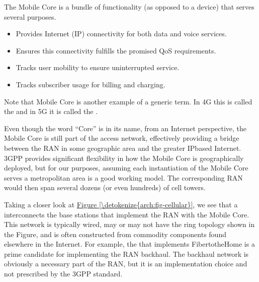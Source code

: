 \documentclass[a4paper,11pt,english]{sphinxmanual}
\begin{document}
\sphinxAtStartPar
The Mobile Core is a bundle of functionality (as opposed to a
device) that serves several purposes.
\begin{itemize}
\item {} 
\sphinxAtStartPar
Provides Internet (IP) connectivity for both data and voice services.

\item {} 
\sphinxAtStartPar
Ensures this connectivity fulfills the promised QoS requirements.

\item {} 
\sphinxAtStartPar
Tracks user mobility to ensure uninterrupted service.

\item {} 
\sphinxAtStartPar
Tracks subscriber usage for billing and charging.

\end{itemize}

\sphinxAtStartPar
Note that Mobile Core is another example of a generic term. In 4G
this is called the  and in 5G it is called
the .

\sphinxAtStartPar
Even though the word “Core” is in its name, from an Internet
perspective, the Mobile Core is still part of the access network,
effectively providing a bridge between the RAN in some geographic area
and the greater IP\sphinxhyphen{}based Internet. 3GPP provides significant
flexibility in how the Mobile Core is geographically deployed, but for
our purposes, assuming each instantiation of the Mobile Core serves a
metropolitan area is a good working model. The corresponding RAN would
then span several dozens (or even hundreds) of cell towers.

\sphinxAtStartPar
Taking a closer look at \hyperref[\detokenize{arch:fig-cellular}]{Figure \ref{\detokenize{arch:fig-cellular}}}, we see that a
 interconnects the base stations that implement the RAN with
the Mobile Core. This network is typically wired, may or may not have
the ring topology shown in the Figure, and is often constructed from
commodity components found elsewhere in the Internet. For example, the
 that implements Fiber\sphinxhyphen{}to\sphinxhyphen{}the\sphinxhyphen{}Home is a
prime candidate for implementing the RAN backhaul. The backhaul network
is obviously a necessary part of the RAN, but it is an implementation
choice and not prescribed by the 3GPP standard.
\end{document}
